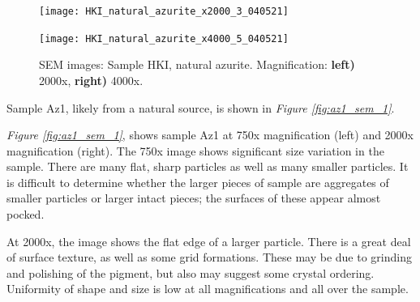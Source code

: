 \begin{figure}[H]
\centering
\begin{minipage}{.45\textwidth}
  \centering
  \texttt{[image: HKI\_natural\_azurite\_x2000\_3\_040521]}
\end{minipage}
\begin{minipage}{.45\textwidth}
  \centering
  \texttt{[image: HKI\_natural\_azurite\_x4000\_5\_040521]}
\end{minipage}
\caption[SEM images: Sample HKI, natural azurite]{SEM images: Sample HKI, natural azurite. Magnification: \textbf{left)} 2000x, \textbf{right)} 4000x.}
\label{fig:hki_nat_az_sem_2}
\end{figure}



Sample Az1, likely from a natural source, is shown in \textit{Figure \ref{fig:az1_sem_1}}. 

\textit{Figure \ref{fig:az1_sem_1}}, shows sample Az1 at 750x magnification (left) and 2000x magnification (right). The 750x image shows significant size variation in the sample. There are many flat, sharp particles as well as many smaller particles. It is difficult to determine whether the larger pieces of sample are aggregates of smaller particles or larger intact pieces; the surfaces of these appear almost pocked.

At 2000x, the image shows the flat edge of a larger particle. There is a great deal of surface texture, as well as some grid formations. These may be due to grinding and polishing of the pigment, but also may suggest some crystal ordering. Uniformity of shape and size is low at all magnifications and all over the sample.


